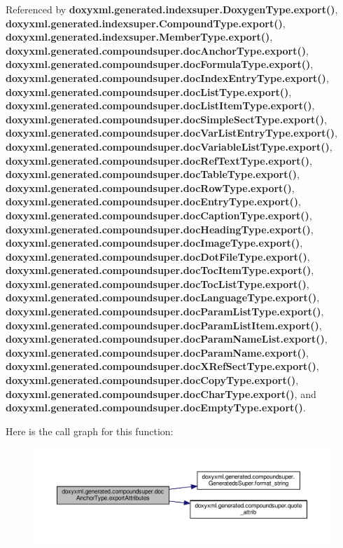 Referenced by {\bf doxyxml.\+generated.\+indexsuper.\+Doxygen\+Type.\+export()}, {\bf doxyxml.\+generated.\+indexsuper.\+Compound\+Type.\+export()}, {\bf doxyxml.\+generated.\+indexsuper.\+Member\+Type.\+export()}, {\bf doxyxml.\+generated.\+compoundsuper.\+doc\+Anchor\+Type.\+export()}, {\bf doxyxml.\+generated.\+compoundsuper.\+doc\+Formula\+Type.\+export()}, {\bf doxyxml.\+generated.\+compoundsuper.\+doc\+Index\+Entry\+Type.\+export()}, {\bf doxyxml.\+generated.\+compoundsuper.\+doc\+List\+Type.\+export()}, {\bf doxyxml.\+generated.\+compoundsuper.\+doc\+List\+Item\+Type.\+export()}, {\bf doxyxml.\+generated.\+compoundsuper.\+doc\+Simple\+Sect\+Type.\+export()}, {\bf doxyxml.\+generated.\+compoundsuper.\+doc\+Var\+List\+Entry\+Type.\+export()}, {\bf doxyxml.\+generated.\+compoundsuper.\+doc\+Variable\+List\+Type.\+export()}, {\bf doxyxml.\+generated.\+compoundsuper.\+doc\+Ref\+Text\+Type.\+export()}, {\bf doxyxml.\+generated.\+compoundsuper.\+doc\+Table\+Type.\+export()}, {\bf doxyxml.\+generated.\+compoundsuper.\+doc\+Row\+Type.\+export()}, {\bf doxyxml.\+generated.\+compoundsuper.\+doc\+Entry\+Type.\+export()}, {\bf doxyxml.\+generated.\+compoundsuper.\+doc\+Caption\+Type.\+export()}, {\bf doxyxml.\+generated.\+compoundsuper.\+doc\+Heading\+Type.\+export()}, {\bf doxyxml.\+generated.\+compoundsuper.\+doc\+Image\+Type.\+export()}, {\bf doxyxml.\+generated.\+compoundsuper.\+doc\+Dot\+File\+Type.\+export()}, {\bf doxyxml.\+generated.\+compoundsuper.\+doc\+Toc\+Item\+Type.\+export()}, {\bf doxyxml.\+generated.\+compoundsuper.\+doc\+Toc\+List\+Type.\+export()}, {\bf doxyxml.\+generated.\+compoundsuper.\+doc\+Language\+Type.\+export()}, {\bf doxyxml.\+generated.\+compoundsuper.\+doc\+Param\+List\+Type.\+export()}, {\bf doxyxml.\+generated.\+compoundsuper.\+doc\+Param\+List\+Item.\+export()}, {\bf doxyxml.\+generated.\+compoundsuper.\+doc\+Param\+Name\+List.\+export()}, {\bf doxyxml.\+generated.\+compoundsuper.\+doc\+Param\+Name.\+export()}, {\bf doxyxml.\+generated.\+compoundsuper.\+doc\+X\+Ref\+Sect\+Type.\+export()}, {\bf doxyxml.\+generated.\+compoundsuper.\+doc\+Copy\+Type.\+export()}, {\bf doxyxml.\+generated.\+compoundsuper.\+doc\+Char\+Type.\+export()}, and {\bf doxyxml.\+generated.\+compoundsuper.\+doc\+Empty\+Type.\+export()}.



Here is the call graph for this function\+:
\nopagebreak
\begin{figure}[H]
\begin{center}
\leavevmode
\includegraphics[width=350pt]{db/df1/classdoxyxml_1_1generated_1_1compoundsuper_1_1docAnchorType_a6ae8c28af5ccd21f8edb6e7cfc335d67_cgraph}
\end{center}
\end{figure}




